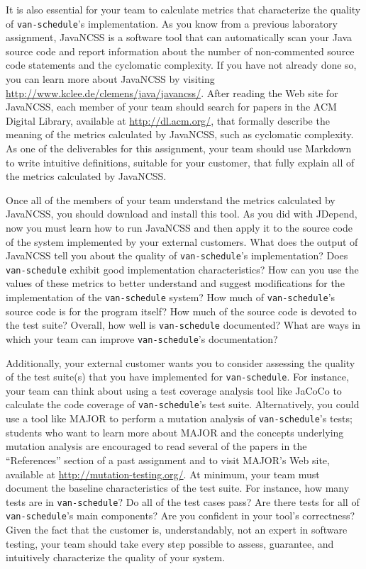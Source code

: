 It is also essential for your team to calculate metrics that characterize the quality of {\tt van-schedule}'s
implementation.  As you know from a previous laboratory assignment, JavaNCSS is a software tool that can automatically
scan your Java source code and report information about the number of non-commented source code statements and the
cyclomatic complexity.  If you have not already done so, you can learn more about JavaNCSS by visiting
\url{http://www.kclee.de/clemens/java/javancss/}. After reading the Web site for JavaNCSS, each member of your team
should search for papers in the ACM Digital Library, available at \url{http://dl.acm.org/}, that formally describe the
meaning of the metrics calculated by JavaNCSS, such as cyclomatic complexity. As one of the deliverables for this
assignment, your team should use Markdown to write intuitive definitions, suitable for your customer, that fully explain
all of the metrics calculated by JavaNCSS.

Once all of the members of your team understand the metrics calculated by JavaNCSS, you should download and install this
tool.  As you did with JDepend, now you must learn how to run JavaNCSS and then apply it to the source code of the
system implemented by your external customers.  What does the output of JavaNCSS tell you about the quality of
{\tt van-schedule}'s implementation? Does {\tt van-schedule} exhibit good implementation characteristics? How can you use the
values of these metrics to better understand and suggest modifications for the implementation of the {\tt van-schedule}
system? How much of {\tt van-schedule}'s source code is for the program itself? How much of the source code is devoted to the
test suite?  Overall, how well is {\tt van-schedule} documented? What are ways in which your team can improve {\tt van-schedule}'s
documentation?

Additionally, your external customer wants you to consider assessing the quality of the test suite(s) that you have
implemented for {\tt van-schedule}. For instance, your team can think about using a test coverage analysis tool like
JaCoCo to calculate the code coverage of {\tt van-schedule}'s test suite. Alternatively, you could use a tool like MAJOR
to perform a mutation analysis of {\tt van-schedule}'s tests; students who want to learn more about MAJOR and the
concepts underlying mutation analysis are encouraged to read several of the papers in the ``References'' section of a
past assignment and to visit MAJOR's Web site, available at \url{http://mutation-testing.org/}. At minimum, your team
must document the baseline characteristics of the test suite. For instance, how many tests are in {\tt van-schedule}?
Do all of the test cases pass?  Are there tests for all of {\tt van-schedule}'s main components? Are you confident in
your tool's correctness? Given the fact that the customer is, understandably, not an expert in software testing, your
team should take every step possible to assess, guarantee, and intuitively characterize the quality of your system.

